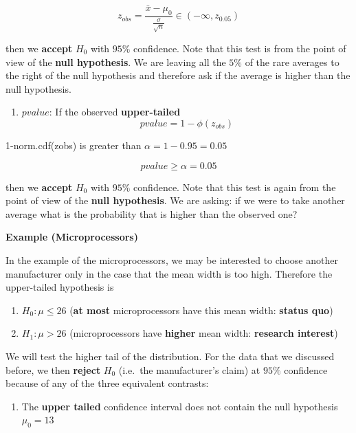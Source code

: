 \documentclass[
]{book}
\providecommand{\tightlist}{%
  \setlength{\itemsep}{0pt}\setlength{\parskip}{0pt}}
\begin{document}
\[z_{obs}=\frac{\bar{x}-\mu_0}{\frac{\sigma}{\sqrt{n}}} \in (-\infty, z_{0.05})\]

then we \textbf{accept} \(H_0\) with \(95\%\) confidence. Note that this test is from the point of view of the \textbf{null hypothesis}. We are leaving all the \(5\%\) of the rare averages to the right of the null hypothesis and therefore ask if the average is higher than the null hypothesis.

\begin{enumerate}
\def\labelenumi{\arabic{enumi}.}
\setcounter{enumi}{2}
\tightlist
\item
  \(pvalue\): If the observed \textbf{upper-tailed} \[pvalue= 1-\phi(z_{obs})\]
\end{enumerate}

1-norm.cdf(zobs) is greater than \(\alpha=1-0.95=0.05\)

\[pvalue \geq \alpha =0.05\]

then we \textbf{accept} \(H_0\) with \(95\%\) confidence. Note that this test is again from the point of view of the \textbf{null hypothesis}. We are asking: if we were to take another average what is the probability that is higher than the observed one?

\textbf{Example (Microprocessors)}

In the example of the microprocessors, we may be interested to choose another manufacturer only in the case that the mean width is too high. Therefore the upper-tailed hypothesis is

\begin{enumerate}
\def\labelenumi{\alph{enumi}.}
\tightlist
\item
  \(H_0:\mu \leq 26\) (\textbf{at most} microprocessors have this mean width: \textbf{status quo})
\item
  \(H_1:\mu > 26\) (microprocessors have \textbf{higher} mean width: \textbf{research interest})
\end{enumerate}

We will test the higher tail of the distribution.
For the data that we discussed before, we then \textbf{reject} \(H_0\) (i.e.~the manufacturer's claim) at \(95\%\) confidence because of any of the three equivalent contrasts:

\begin{enumerate}
\def\labelenumi{\arabic{enumi}.}
\tightlist
\item
  The \textbf{upper tailed} confidence interval does not contain the null hypothesis \(\mu_0=13\)
\end{enumerate}
\end{document}
